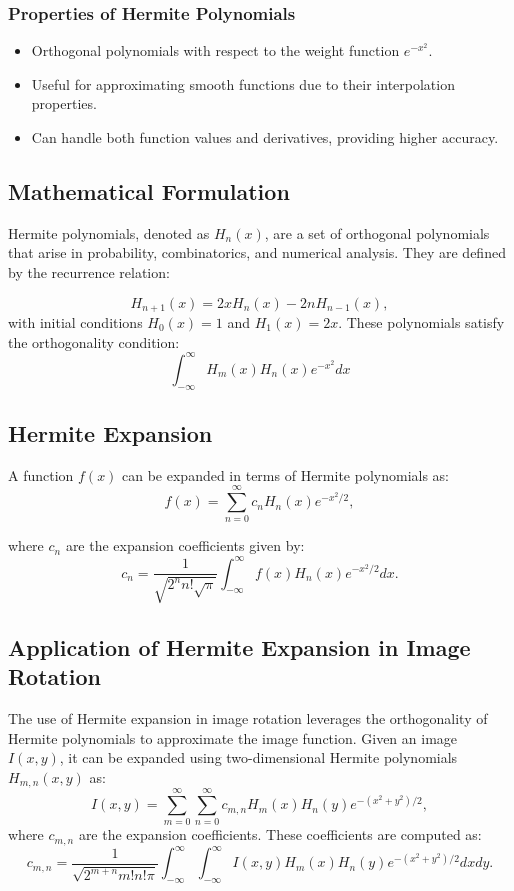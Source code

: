\documentclass[conference]{IEEEtran}
\begin{document}
\subsubsection{Properties of Hermite Polynomials}
\begin{itemize}
    \item Orthogonal polynomials with respect to the weight function $e^{-x^2}$.
    \item Useful for approximating smooth functions due to their interpolation properties.
    \item Can handle both function values and derivatives, providing higher accuracy.
\end{itemize}

\subsection{Mathematical Formulation}
Hermite polynomials, denoted as $H_n(x)$, are a set of orthogonal polynomials that arise in probability, combinatorics, and numerical analysis. They are defined by the recurrence relation:

$$
H_{n+1}(x) = 2xH_n(x) - 2nH_{n-1}(x),
$$ with initial conditions $H_0(x) = 1$ and $H_1(x) = 2x$. 
These polynomials satisfy the orthogonality condition:
$$
\int_{-\infty}^{\infty} H_m(x)H_n(x)e^{-x^2}dx
$$

\subsection{Hermite Expansion}

A function $f(x)$ can be expanded in terms of Hermite polynomials as:
$$
f(x) = \sum_{n=0}^{\infty} c_n H_n(x) e^{-x^2/2},
$$

where $c_n$ are the expansion coefficients given by:
$$
c_n = \frac{1}{\sqrt{2^n n! \sqrt{\pi}}} \int_{-\infty}^{\infty} f(x) H_n(x) e^{-x^2/2} dx.
$$


\subsection{Application of Hermite Expansion in Image Rotation}

The use of Hermite expansion in image rotation leverages the orthogonality of Hermite polynomials to approximate the image function. Given an image $I(x,y)$, it can be expanded using two-dimensional Hermite polynomials $H_{m,n}(x,y)$ as:
$$
I(x,y) = \sum_{m=0}^{\infty} \sum_{n=0}^{\infty} c_{m,n} H_m(x) H_n(y) e^{-(x^2 + y^2)/2},
$$
where $c_{m,n}$ are the expansion coefficients. These coefficients are computed as:
$$
c_{m,n} = \frac{1}{\sqrt{2^{m+n} m! n! \pi}} \int_{-\infty}^{\infty} \int_{-\infty}^{\infty} I(x,y) H_m(x) H_n(y) e^{-(x^2 + y^2)/2} dx dy.
$$
\end{document}
